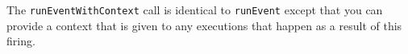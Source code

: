 The \verb+runEventWithContext+ call is identical to \verb+runEvent+ except that you can provide
a context that is given to any executions that happen as a result of this firing.
